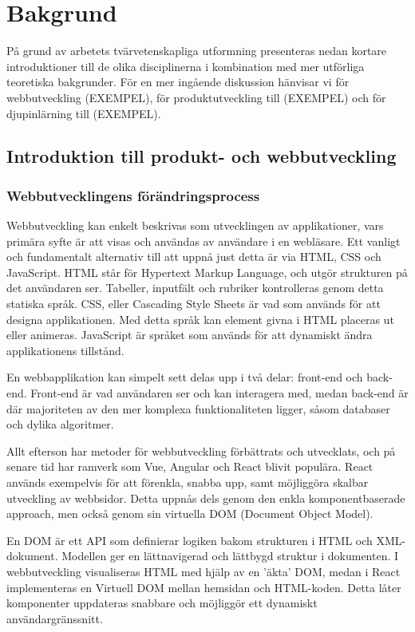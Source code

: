 \chapter{Bakgrund}

På grund av arbetets tvärvetenskapliga utformning presenteras nedan kortare introduktioner till de olika disciplinerna i kombination med mer utförliga teoretiska bakgrunder. För en mer ingående diskussion hänvisar vi för webbutveckling (EXEMPEL), för produktutveckling till (EXEMPEL) och för djupinlärning till (EXEMPEL). 

\section{Introduktion till produkt- och webbutveckling}




\subsection{Webbutvecklingens förändringsprocess}
Webbutveckling kan enkelt beskrivas som utvecklingen av applikationer, vars primära syfte är att visas och användas av användare i en webläsare. Ett vanligt och fundamentalt alternativ till att uppnå just detta är via HTML, CSS och JavaScript. HTML står för Hypertext Markup Language, och utgör strukturen på det användaren ser. Tabeller, inputfält och rubriker kontrolleras genom detta statiska språk. CSS, eller Cascading Style Sheets är vad som används för att designa applikationen. Med detta språk kan element givna i HTML placeras ut eller animeras. JavaScript är språket som används för att dynamiskt ändra applikationens tillstånd\cite{Webbutveckling}.

En webbapplikation kan simpelt sett delas upp i två delar: front-end och back-end. Front-end är vad användaren ser och kan interagera med, medan back-end är där majoriteten av den mer komplexa funktionaliteten ligger, såsom databaser och dylika algoritmer. 

Allt efterson har metoder för webbutveckling förbättrats och utvecklats, och på senare tid har ramverk som Vue, Angular och React blivit populära.\cite{webstats} React används exempelvis för att förenkla, snabba upp, samt möjliggöra skalbar utveckling av webbsidor. Detta uppnås dels genom den enkla komponentbaserade approach, men också genom sin virtuella DOM (Document Object Model).

En DOM är ett API som definierar logiken bakom strukturen i HTML och XML-dokument. Modellen ger en lättnavigerad och lättbygd struktur i dokumenten. I webbutveckling visualiseras HTML med hjälp av en 'äkta' DOM, medan i React implementeras en Virtuell DOM mellan hemsidan och HTML-koden. Detta låter komponenter uppdateras snabbare och möjliggör ett dynamiskt användargränssnitt.

